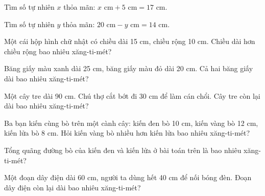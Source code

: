 \begin{ex}
Tìm số tự nhiên $x$ thỏa mãn: $x\text{ cm} + 5\text{ cm} = 17\text{ cm}$.
\end{ex}

\begin{ex}
Tìm số tự nhiên $y$ thỏa mãn: $20\text{ cm} - y\text{ cm} = 14\text{ cm}$.
\end{ex}

\begin{ex}
Một cái hộp hình chữ nhật có chiều dài 15 cm, chiều rộng 10 cm. Chiều dài hơn chiều rộng bao nhiêu xăng-ti-mét?
\end{ex}

\begin{ex}
Băng giấy màu xanh dài 25 cm, băng giấy màu đỏ dài 20 cm. Cả hai băng giấy dài bao nhiêu xăng-ti-mét?
\end{ex}

\begin{ex}
Một cây tre dài 90 cm. Chú thợ cắt bớt đi 30 cm để làm cán chổi. Cây tre còn lại dài bao nhiêu xăng-ti-mét?
\end{ex}

\begin{ex}
Ba bạn kiến cùng bò trên một cành cây: kiến đen bò 10 cm, kiến vàng bò 12 cm, kiến lửa bò 8 cm. Hỏi kiến vàng bò nhiều hơn kiến lửa bao nhiêu xăng-ti-mét?
\end{ex}

\begin{ex}
Tổng quãng đường bò của kiến đen và kiến lửa ở bài toán trên là bao nhiêu xăng-ti-mét?
\end{ex}

\begin{ex}
Một đoạn dây điện dài 60 cm, người ta dùng hết 40 cm để nối bóng đèn. Đoạn dây điện còn lại dài bao nhiêu xăng-ti-mét?
\end{ex}

